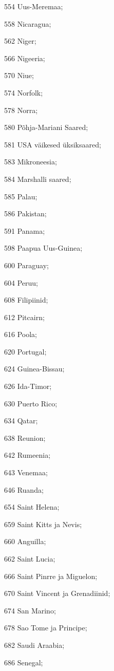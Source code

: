 \documentclass[a4paper]{article}
\begin{document}
\begin{description}
\begin{inparaitem}
    \item[554] Uus-Meremaa;
    \item[558] Nicaragua;
    \item[562] Niger;
    \item[566] Nigeeria;
    \item[570] Niue;
    \item[574] Norfolk;
    \item[578] Norra;
    \item[580] Põhja-Mariani Saared;
    \item[581] USA väikesed üksiksaared;
    \item[583] Mikroneesia;
    \item[584] Marshalli saared;
    \item[585] Palau;
    \item[586] Pakistan;
    \item[591] Panama;
    \item[598] Paapua Uus-Guinea;
    \item[600] Paraguay;
    \item[604] Peruu;
    \item[608] Filipiinid;
    \item[612] Pitcairn;
    \item[616] Poola;
    \item[620] Portugal;
    \item[624] Guinea-Bissau;
    \item[626] Ida-Timor;
    \item[630] Puerto Rico;
    \item[634] Qatar;
    \item[638] Reunion;
    \item[642] Rumeenia;
    \item[643] Venemaa;
    \item[646] Ruanda;
    \item[654] Saint Helena;
    \item[659] Saint Kitts ja Nevis;
    \item[660] Anguilla;
    \item[662] Saint Lucia;
    \item[666] Saint Pinrre ja Miguelon;
    \item[670] Saint Vincent ja Grenadiinid;
    \item[674] San Marino;
    \item[678] Sao Tome ja Principe;
    \item[682] Saudi Araabia;
    \item[686] Senegal;

\end{inparaitem}
\end{description}
\end{document}
